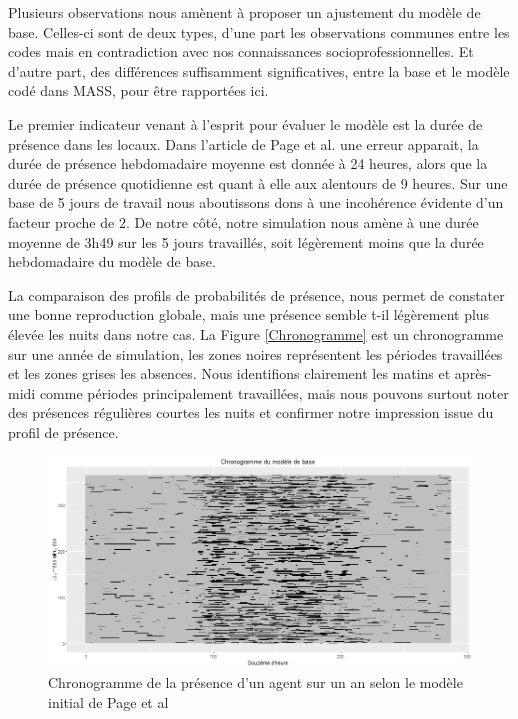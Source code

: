
Plusieurs observations nous amènent à proposer un ajustement du modèle de base. Celles-ci sont de deux types, d'une part les observations communes entre les codes mais en contradiction avec nos connaissances socioprofessionnelles. Et d'autre part, des différences suffisamment significatives, entre la base et le modèle codé dans MASS, pour être rapportées ici.

Le premier indicateur venant à l'esprit pour évaluer le modèle est la durée de présence dans les locaux. Dans l'article de Page et al. \cite{Page-08} une erreur apparait, la durée de présence hebdomadaire moyenne est donnée à 24 heures, alors que la durée de présence quotidienne est quant à elle aux alentours de 9 heures. Sur une base de 5 jours de travail nous aboutissons dons à une incohérence évidente d'un facteur proche de 2.  De notre côté, notre simulation nous amène à une durée moyenne de 3h49 sur les 5 jours travaillés, soit légèrement moins que la durée hebdomadaire du modèle de base.

La comparaison des profils de probabilités de présence, nous permet de constater une bonne reproduction globale, mais une présence semble t-il légèrement plus élevée les nuits dans notre cas. La Figure \ref{Chronogramme} est un chronogramme sur une année de simulation, les zones noires représentent les périodes travaillées et les zones grises les absences. Nous identifions clairement les matins et après-midi comme périodes principalement travaillées, mais nous pouvons surtout noter des présences régulières courtes les nuits et confirmer notre impression issue du profil de présence.

\begin{figure}[H]
\centering
\includegraphics[scale=0.5]{Images/PageActivities/ChronogrammeBase}
\caption{Chronogramme de la présence d'un agent sur un an selon le modèle initial de Page et al \cite{Page-08}}
\label{fig:ChronogrammeBase}
\end{figure}



